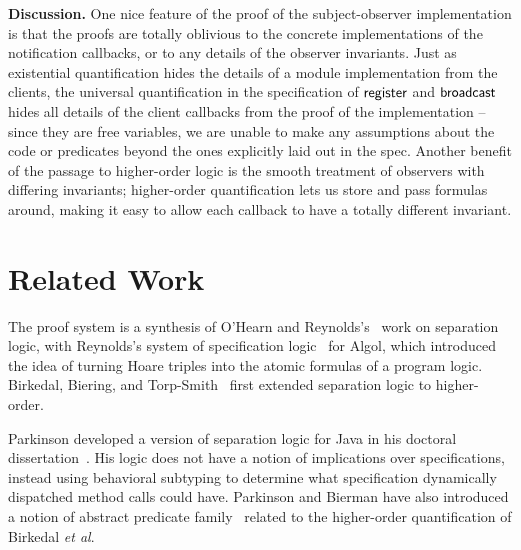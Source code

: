 \documentclass[preprint,natbib]{sigplanconf}
\begin{document}
\textbf{Discussion.} One nice feature of the proof of the
subject-observer implementation is that the proofs are totally
oblivious to the concrete implementations of the notification
callbacks, or to any details of the observer invariants. Just as
existential quantification hides the details of a module
implementation from the clients, the universal quantification in the
specification of $\mbox{\textsf{{register}}}$ and $\mbox{\textsf{{broadcast}}}$ hides all
details of the client callbacks from the proof of the implementation
-- since they are free variables, we are unable to make any
assumptions about the code or predicates beyond the ones explicitly
laid out in the spec. Another benefit of the passage to higher-order
logic is the smooth treatment of observers with differing invariants;
higher-order quantification lets us store and pass formulas around,
making it easy to allow each callback to have a totally different
invariant. 




\section{Related Work}
The proof system is a synthesis of O'Hearn and
Reynolds's~\cite{sep-logic} work on separation logic, with Reynolds's
system of specification logic~\cite{spec-logic} for Algol, which
introduced the idea of turning Hoare triples into the atomic formulas
of a program logic. Birkedal, Biering, and Torp-Smith~\cite{hosl}
first extended separation logic to higher-order.

Parkinson developed a version of separation logic for Java in his
doctoral dissertation~\cite{parkinson-thesis}. His logic does not have
a notion of implications over specifications, instead using behavioral
subtyping to determine what specification dynamically dispatched
method calls could have. Parkinson and Bierman have also introduced a
notion of abstract predicate family~\cite{parkinson-bierman-05}
related to the higher-order quantification of Birkedal \emph{et al}.

\end{document}
